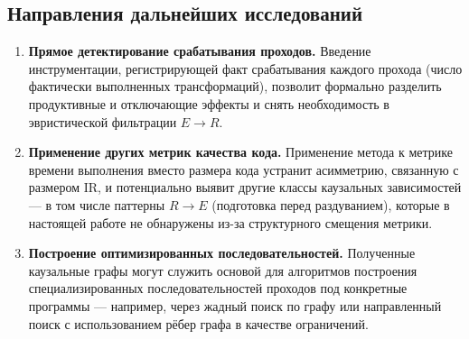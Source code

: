 \subsection*{Направления дальнейших исследований}

\begin{enumerate}
    \item \textbf{Прямое детектирование срабатывания проходов.} Введение инструментации, регистрирующей факт срабатывания каждого прохода (число фактически выполненных трансформаций), позволит формально разделить продуктивные и отключающие эффекты и снять необходимость в эвристической фильтрации $E \to R$.

    \item \textbf{Применение других метрик качества кода.} Применение метода к метрике времени выполнения вместо размера кода устранит асимметрию, связанную с размером IR, и потенциально выявит другие классы каузальных зависимостей --- в том числе паттерны $R \to E$ (подготовка перед раздуванием), которые в настоящей работе не обнаружены из-за структурного смещения метрики.

    \item \textbf{Построение оптимизированных последовательностей.} Полученные каузальные графы могут служить основой для алгоритмов построения специализированных последовательностей проходов под конкретные программы --- например, через жадный поиск по графу или направленный поиск с использованием рёбер графа в качестве ограничений.
\end{enumerate}

\newpage
